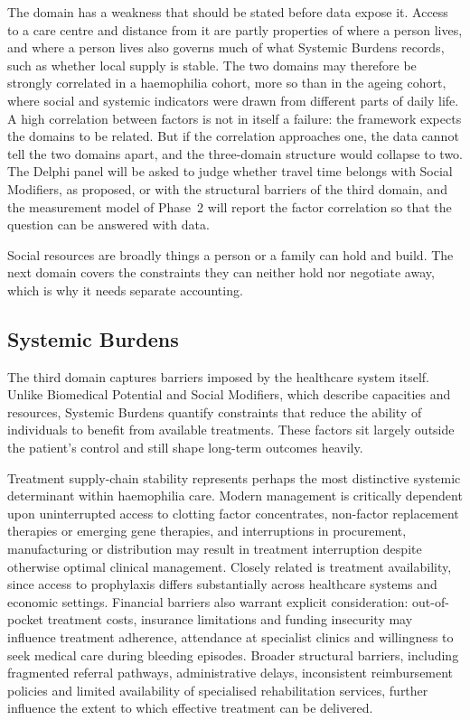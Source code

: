The domain has a weakness that should be stated before data expose it. Access to a care centre and distance from it are partly properties of where a person lives, and where a person lives also governs much of what Systemic Burdens records, such as whether local supply is stable. The two domains may therefore be strongly correlated in a haemophilia cohort, more so than in the ageing cohort, where social and systemic indicators were drawn from different parts of daily life. A high correlation between factors is not in itself a failure: the framework expects the domains to be related. But if the correlation approaches one, the data cannot tell the two domains apart, and the three-domain structure would collapse to two. The Delphi panel will be asked to judge whether travel time belongs with Social Modifiers, as proposed, or with the structural barriers of the third domain, and the measurement model of Phase~2 will report the factor correlation so that the question can be answered with data.

Social resources are broadly things a person or a family can hold and
build. The next domain covers the constraints they can neither hold nor
negotiate away, which is why it needs separate accounting.

\subsection{Systemic Burdens}

The third domain captures barriers imposed by the healthcare system itself. Unlike Biomedical Potential and Social Modifiers, which describe capacities and resources, Systemic Burdens quantify constraints that reduce the ability of individuals to benefit from available treatments. These factors sit largely outside the patient's control and still shape long-term outcomes heavily.

Treatment supply-chain stability represents perhaps the most distinctive systemic determinant within haemophilia care. Modern management is critically dependent upon uninterrupted access to clotting factor concentrates, non-factor replacement therapies or emerging gene therapies, and interruptions in procurement, manufacturing or distribution may result in treatment interruption despite otherwise optimal clinical management. Closely related is treatment availability, since access to prophylaxis differs substantially across healthcare systems and economic settings. Financial barriers also warrant explicit consideration: out-of-pocket treatment costs, insurance limitations and funding insecurity may influence treatment adherence, attendance at specialist clinics and willingness to seek medical care during bleeding episodes. Broader structural barriers, including fragmented referral pathways, administrative delays, inconsistent reimbursement policies and limited availability of specialised rehabilitation services, further influence the extent to which effective treatment can be delivered.

